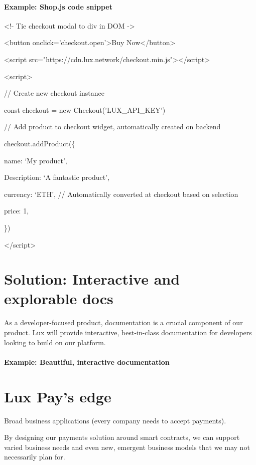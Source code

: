 \documentclass[11pt]{article}
\begin{document}
\paragraph{Example: Shop.js code snippet}

<!- Tie checkout modal to div in DOM ->


<button onclick='checkout.open'>Buy Now</button>


<script src="https://cdn.lux.network/checkout.min.js"></script>


<script>


// Create new checkout instance


const checkout = new Checkout('LUX\_API\_KEY')


// Add product to checkout widget, automatically created on backend


checkout.addProduct(\{


name: `My product',


Description: `A fantastic product',


currency: `ETH', // Automatically converted at checkout based on selection


price: 1,


\})


</script>


\section{Solution: Interactive and explorable docs}

As a developer-focused product, documentation is a crucial component of our product. Lux will provide interactive, best-in-class documentation for developers looking to build on our platform.


\paragraph{Example: Beautiful, interactive documentation}

\section{Lux Pay's edge}

Broad business applications (every company needs to accept payments).


By designing our payments solution around smart contracts, we can support varied business needs and even new, emergent business models that we may not necessarily plan for.
\end{document}
